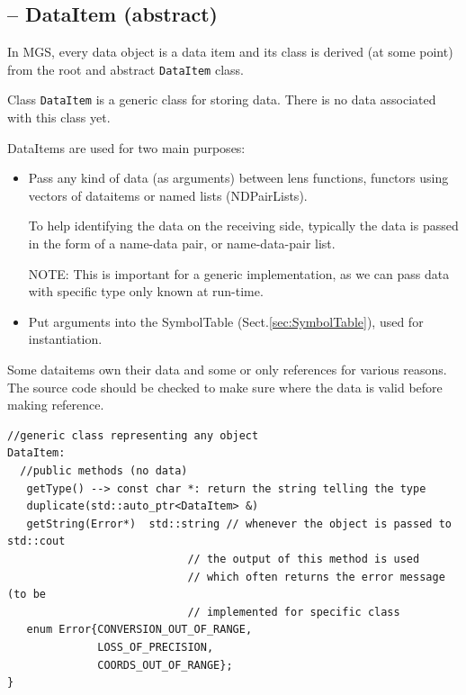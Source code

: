 \subsection{-- DataItem (abstract)}
\label{sec:DataItem}

In MGS, every data object is a data item and its class is derived (at some
point) from the root and abstract \verb!DataItem! class.

Class \verb!DataItem! is a generic class for storing data. There is no data
associated with this class yet.

DataItems are used for two main purposes:
\begin{itemize}
  
 \item Pass any kind of data (as arguments) between lens functions, functors
 using vectors of dataitems or named lists (NDPairLists).

To help identifying the data on the receiving side, typically the data is passed
in the form of a name-data pair, or name-data-pair list.

NOTE: This is important for a generic implementation, as we can pass data with
specific type only known at run-time.

  \item	Put arguments into the SymbolTable (Sect.\ref{sec:SymbolTable}), used
  for instantiation.
  
\end{itemize}

Some dataitems own their data and some or only references for various reasons.
The source code should be checked to make sure where the data is valid before
making reference.


\begin{verbatim}
//generic class representing any object
DataItem: 
  //public methods (no data)
   getType() --> const char *: return the string telling the type
   duplicate(std::auto_ptr<DataItem> &)
   getString(Error*)  std::string // whenever the object is passed to std::cout
                            // the output of this method is used
                            // which often returns the error message (to be
                            // implemented for specific class
   enum Error{CONVERSION_OUT_OF_RANGE, 
              LOSS_OF_PRECISION, 
              COORDS_OUT_OF_RANGE};
}

\end{verbatim}


